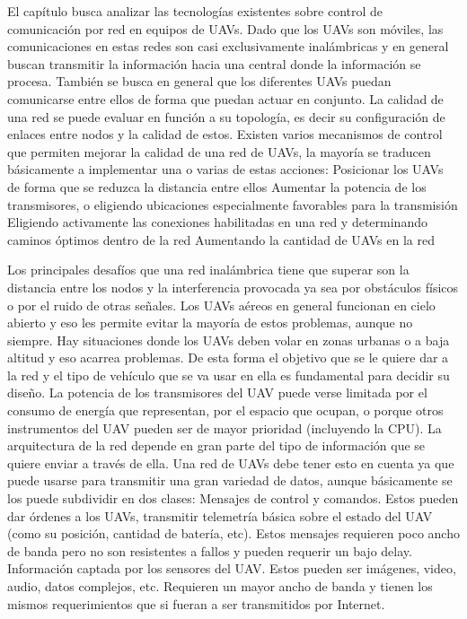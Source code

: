 El capítulo busca analizar las tecnologías existentes sobre control de comunicación por red en equipos de UAVs. Dado que los UAVs son móviles, las comunicaciones en estas redes son casi exclusivamente inalámbricas y en general buscan transmitir la información hacia una central donde la información se procesa. También se busca en general que los diferentes UAVs puedan comunicarse entre ellos de forma que puedan actuar en conjunto. La calidad de una red se puede evaluar en función a su topología, es decir su configuración de enlaces entre nodos y la calidad de estos. Existen varios mecanismos de control que permiten mejorar la calidad de una red de UAVs, la mayoría se traducen básicamente a implementar una o varias de estas acciones:
Posicionar los UAVs de forma que se reduzca la distancia entre ellos
Aumentar la potencia de los transmisores, o eligiendo ubicaciones especialmente favorables para la transmisión
Eligiendo activamente las conexiones habilitadas en una red y determinando caminos óptimos dentro de la red
Aumentando la cantidad de UAVs en la red

Los principales desafíos que una red inalámbrica tiene que superar son la distancia entre los nodos y la interferencia provocada ya sea por obstáculos físicos o por el ruido de otras señales. Los UAVs aéreos en general funcionan en cielo abierto y eso les permite evitar la mayoría de estos problemas, aunque no siempre. Hay situaciones donde los UAVs deben volar en zonas urbanas o a baja altitud y eso acarrea problemas. De esta forma el objetivo que se le quiere dar a la red y el tipo de vehículo que se va usar en ella es fundamental para decidir su diseño. La potencia de los transmisores del UAV puede verse limitada por el consumo de energía que representan, por el espacio que ocupan, o porque otros instrumentos del UAV pueden ser de mayor prioridad (incluyendo la CPU).
La arquitectura de la red depende en gran parte del tipo de información que se quiere enviar a través de ella. Una red de UAVs debe tener esto en cuenta ya que puede usarse para transmitir una gran variedad de datos, aunque básicamente se los puede subdividir en dos clases:
Mensajes de control y comandos. Estos pueden dar órdenes a los UAVs, transmitir telemetría básica sobre el estado del UAV (como su posición, cantidad de batería, etc). Estos mensajes requieren poco ancho de banda pero no son resistentes a fallos y pueden requerir un bajo delay.
Información captada por los sensores del UAV. Estos pueden ser imágenes, video, audio, datos complejos, etc. Requieren un mayor ancho de banda y tienen los mismos requerimientos que si fueran a ser transmitidos por Internet.

